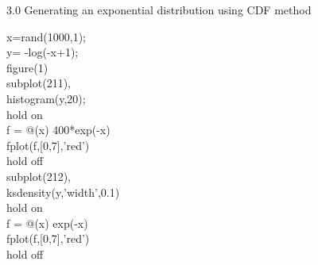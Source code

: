 \documentclass[twoside,twocolumn]{article}
\begin{document}
\begin{large}
3.0 Generating an exponential distribution using CDF method
\end{large}
\newline
\begin{itshape}
x=rand(1000,1);\\
y= -log(-x+1);\\

figure(1)\\
subplot(211),\\
histogram(y,20);\\
hold on \\
f = @(x) 400*exp(-x)\\
fplot(f,[0,7],'red')\\
hold off\\
subplot(212),\\
ksdensity(y,'width',0.1)\\
hold on \\
f = @(x) exp(-x)\\
fplot(f,[0,7],'red')\\
hold off\\
\end{itshape}
\end{document}
